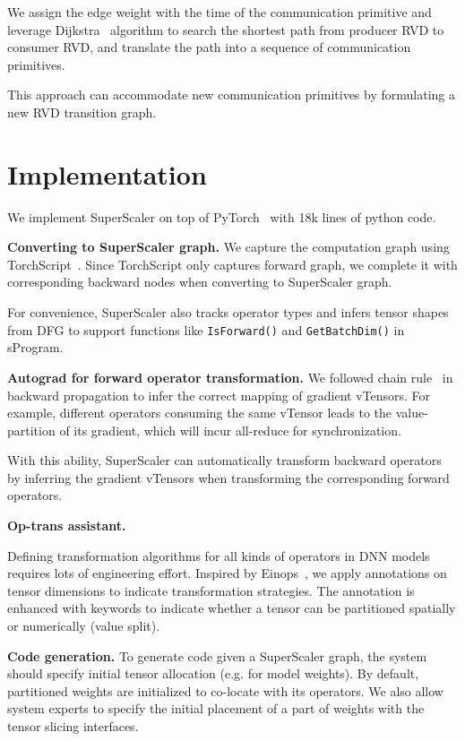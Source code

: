 We assign the edge weight with the time of the communication primitive and leverage Dijkstra~\cite{dijkstra} algorithm to search the shortest path from producer RVD to consumer RVD, and translate the path into a sequence of communication primitives.

This approach can accommodate new communication primitives by formulating a new RVD transition graph.

\section{Implementation}
\label{sec:imple}

We implement {SuperScaler} on top of PyTorch~\cite{PyTorch} with 18k lines of python code.

{\bf  Converting to {SuperScaler} graph. } We capture the computation graph using TorchScript~\cite{torchscript}. Since TorchScript only captures forward graph, we complete it with corresponding backward  nodes when converting to {SuperScaler} graph.

For convenience, {SuperScaler} also tracks operator types and infers tensor shapes from DFG to support functions like \texttt{IsForward()} and \texttt{GetBatchDim()} in {sProgram}.

{\bf  Autograd for forward operator transformation. } We followed chain rule~\cite{chain-rule} in backward propagation to infer the correct mapping of gradient vTensors. For example, different operators consuming the same vTensor leads to the value-partition of its gradient, which will incur all-reduce for synchronization.

With this ability, {SuperScaler} can automatically transform backward operators by inferring the gradient vTensors when transforming the corresponding forward operators.

{\bf  Op-trans assistant. }

Defining transformation algorithms for all kinds of operators in DNN models requires lots of engineering effort. Inspired by Einops~\cite{einops}, we apply annotations on tensor dimensions to indicate transformation strategies. The annotation is enhanced with keywords to indicate whether a tensor can be partitioned spatially or numerically (value split). 

{\bf  Code generation. } To generate code given a {SuperScaler} graph, the system should specify initial tensor allocation (e.g. for model weights). By default, partitioned weights are initialized to co-locate with its operators. We also allow system experts to specify the initial placement of a part of weights with the tensor slicing interfaces.

